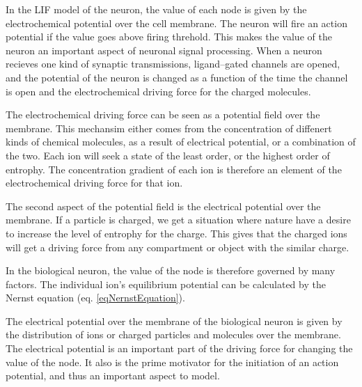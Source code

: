 \documentclass[b5paper,11 pt]{report}
\begin{document}
	In the LIF model of the neuron,  the value of each node is given by the electrochemical potential over the cell membrane. 
	The neuron will fire an action potential if the value goes above firing threhold.
	This makes the value of the neuron an important aspect of neuronal signal processing.
	When a neuron recieves one kind of synaptic transmissions, ligand--gated channels are opened, and the potential of the neuron is changed as a function of the time the channel is open 
		and the electrochemical driving force for the charged molecules.

	The electrochemical driving force can be seen as a potential field over the membrane.
	This mechansim either comes from the concentration of diffenert kinds of chemical molecules, as a result of electrical potential, or a combination of the two.
	Each ion will seek a state of the least order, or the highest order of entrophy. 
	The concentration gradient of each ion is therefore an element of the electrochemical driving force for that ion.
	
	The second aspect of the potential field is the electrical potential over the membrane. 
	If a particle is charged, we get a situation where nature have a desire to increase the level of entrophy for the charge.
	This gives that the charged ions will get a driving force from any compartment or object with the similar charge.
	
	
	In the biological neuron, the value of the node is therefore governed by many factors. 
	The individual ion's equilibrium potential can be calculated by the Nernst equation (eq. \ref{eqNernstEquation}).


	The electrical potential over the membrane of the biological neuron is given by the distribution of ions or charged particles and molecules over the  membrane.
	The electrical potential is an important part of the driving force for changing the value of the node.
	It also is the prime motivator for the initiation of an action potential, and thus an important aspect to model.
\end{document}

